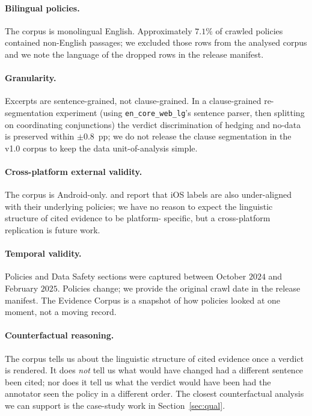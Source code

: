 \documentclass[11pt,a4paper]{article}
\begin{document}
\paragraph{Bilingual policies.}
The corpus is monolingual English. Approximately $7.1\%$ of crawled
policies contained non-English passages; we excluded those rows from
the analysed corpus and we note the language of the dropped rows in
the release manifest.

\paragraph{Granularity.}
Excerpts are sentence-grained, not clause-grained. In a clause-grained
re-segmentation experiment (using \texttt{en\_core\_web\_lg}'s sentence
parser, then splitting on coordinating conjunctions) the verdict
discrimination of hedging and no-data is preserved within $\pm0.8$~pp;
we do not release the clause segmentation in the v1.0 corpus to keep
the data unit-of-analysis simple.

\paragraph{Cross-platform external validity.}
The corpus is Android-only. \citet{xiao2023lalaine} and
\citet{khandelwal2023comparing} report that iOS labels are also
under-aligned with their underlying policies; we have no reason to
expect the linguistic structure of cited evidence to be platform-
specific, but a cross-platform replication is future work.

\paragraph{Temporal validity.}
Policies and Data Safety sections were captured between October
$2024$ and February $2025$. Policies change; we provide the original
crawl date in the release manifest. The Evidence Corpus is a snapshot
of how policies looked at one moment, not a moving record.

\paragraph{Counterfactual reasoning.}
The corpus tells us about the linguistic structure of cited evidence
once a verdict is rendered. It does \emph{not} tell us what would
have changed had a different sentence been cited; nor does it tell
us what the verdict would have been had the annotator seen the policy
in a different order. The closest counterfactual analysis we can
support is the case-study work in Section~\ref{sec:qual}.
\end{document}
